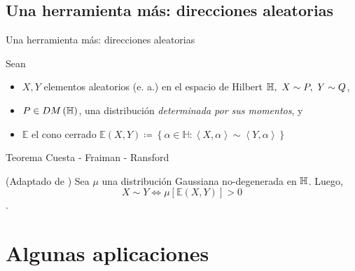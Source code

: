 \documentclass[10pt,spanish,handout]{beamer}\usepackage[]{graphicx}\usepackage[]{color}
\begin{document}
\subsection{Una herramienta más: direcciones aleatorias}
\begin{frame}{Una herramienta más: direcciones aleatorias}

Sean
\begin{itemize}
\item $X,Y$ elementos aleatorios (e. a.) en el espacio de Hilbert $\mathbb{H},\ X\sim P,\ Y\sim Q$,
\end{itemize}

\pause{}
\begin{itemize}
\item $P\in DM\left(\mathbb{H}\right)$, una distribución \emph{determinada por
sus momentos}, y
\end{itemize}

\pause{}
\begin{itemize}
\item $\mathbb{E}$ el cono cerrado $\mathbb{E}\left(X,Y\right)\coloneqq\left\{ \alpha\in\mathbb{H}:\left\langle X,\alpha\right\rangle \sim\left\langle Y,\alpha\right\rangle \right\} $
\end{itemize}

\pause{}
\begin{exampleblock}{Teorema Cuesta - Fraiman - Ransford}

(Adaptado de \cite{Cuesta 2007}) Sea $\mu$ una distribución Gaussiana
no-degenerada en $\mathbb{H}$. Luego, 
\[
X\sim Y\iff\mu\left[\mathbb{E}\left(X,Y\right)\right]>0
\]
.
\end{exampleblock}
\end{frame}

\section[Aplicaciones]{Algunas aplicaciones}
\end{document}
